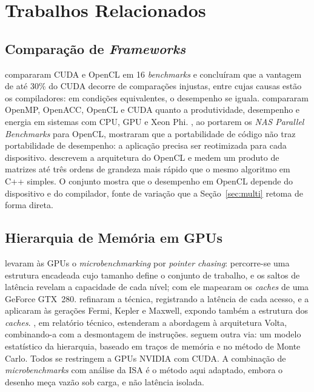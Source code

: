 \documentclass[12pt]{article}
\begin{document}
\section{Trabalhos Relacionados}
\label{sec:relacionados}

\subsection{Comparação de \textit{Frameworks}}

\cite{fang2011} compararam CUDA e OpenCL em 16 \textit{benchmarks} e concluíram que a vantagem de até 30\% do CUDA decorre de comparações injustas, entre cujas causas estão os compiladores: em condições equivalentes, o desempenho se iguala. \cite{memeti2017} compararam OpenMP, OpenACC, OpenCL e CUDA quanto a produtividade, desempenho e energia em sistemas com CPU, GPU e Xeon Phi. \cite{seo2011}, ao portarem os \textit{NAS Parallel Benchmarks} para OpenCL, mostraram que a portabilidade de código não traz portabilidade de desempenho: a aplicação precisa ser reotimizada para cada dispositivo. \cite{fraire2013} descrevem a arquitetura do OpenCL e medem um produto de matrizes até três ordens de grandeza mais rápido que o mesmo algoritmo em C++ simples. O conjunto mostra que o desempenho em OpenCL depende do dispositivo e do compilador, fonte de variação que a Seção~\ref{sec:multi} retoma de forma direta.

\subsection{Hierarquia de Memória em GPUs}

\cite{wong2010} levaram às GPUs o \textit{microbenchmarking} por \textit{pointer chasing}: percorre-se uma estrutura encadeada cujo tamanho define o conjunto de trabalho, e os saltos de latência revelam a capacidade de cada nível; com ele mapearam os \textit{caches} de uma GeForce GTX~280. \cite{mei2017} refinaram a técnica, registrando a latência de cada acesso, e a aplicaram às gerações Fermi, Kepler e Maxwell, expondo também a estrutura dos \textit{caches}. \cite{jia2018}, em relatório técnico, estenderam a abordagem à arquitetura Volta, combinando-a com a desmontagem de instruções. \cite{baghsorkhi2012} seguem outra via: um modelo estatístico da hierarquia, baseado em traços de memória e no método de Monte Carlo. Todos se restringem a GPUs NVIDIA com CUDA. A combinação de \textit{microbenchmarks} com análise da ISA é o método aqui adaptado, embora o desenho meça vazão sob carga, e não latência isolada.
\end{document}
